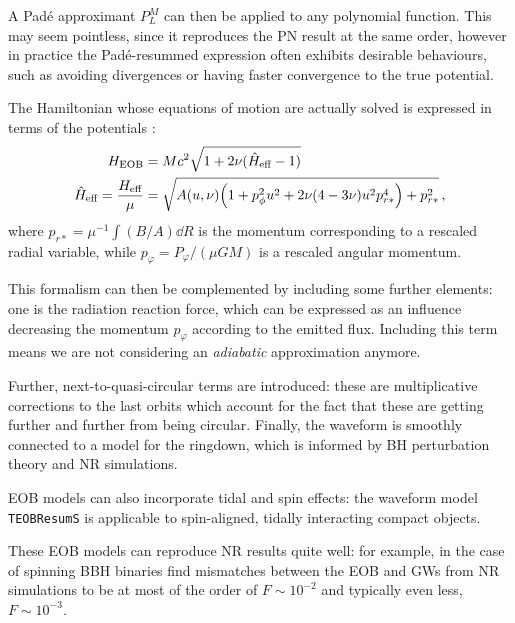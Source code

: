 \documentclass[main.tex]{subfiles}
\begin{document}
A Padé approximant \(P_{L}^{M}\) can then be applied to any polynomial function. 
This may seem pointless, since it reproduces the \ac{PN} result at the same order, however in practice the Padé-resummed expression often exhibits desirable behaviours, such as avoiding divergences or having faster convergence to the true potential. 

The Hamiltonian whose equations of motion are actually solved is expressed in terms of the potentials \cite[eq.\ 8.22]{bernuzziNotesGravitationalWaves2021}:  
%
\begin{align}
H _{\text{EOB}} &= Mc^2 \sqrt{1 + 2 \nu (\hat{H} _{\text{eff}} - 1 )}  \\
\hat{H} _{\text{eff}} = \frac{H_{\text{eff}}}{\mu } &= 
\sqrt{ A(u, \nu ) \qty(1 + p^2_{\phi } u^2 + 2 \nu (4-3 \nu ) u^2 p^{4}_{r*}) + p^2_{r*}}
\,,
\end{align}
%
where \(p_{r*} = \mu^{-1} \int (B/A) \dd{R} \) is the momentum corresponding to a rescaled radial variable, while \(p_\varphi = P_\varphi / (\mu GM)\) is a rescaled angular momentum. 



This formalism can then be complemented by including some further elements: one is the radiation reaction force, which can be expressed as an influence decreasing the momentum \(p_\varphi \) according to the emitted flux.
Including this term means we are not considering an \emph{adiabatic} approximation anymore. 

Further, next-to-quasi-circular terms are introduced: these are multiplicative corrections to the last orbits which account for the fact that these are getting further and further from being circular. 
Finally, the waveform is smoothly connected to a model for the ringdown, which is informed by \ac{BH} perturbation theory and \ac{NR} simulations. 

\ac{EOB} models can also incorporate tidal and spin effects: the waveform model \texttt{TEOBResumS} \cite{nagarTimedomainEffectiveonebodyGravitational2018} is applicable to spin-aligned, tidally interacting compact objects. 

These \ac{EOB} models can reproduce \ac{NR} results quite well: for example, in the case of spinning \ac{BBH} binaries 
\textcite[fig.\ 2]{nagarAllOneEffective2021} find mismatches between the \ac{EOB} and \acp{GW} from \ac{NR} simulations to be at most of the order of \(F \sim 10^{-2}\) and typically even less, \(F \sim 10^{-3}\).
\end{document}
